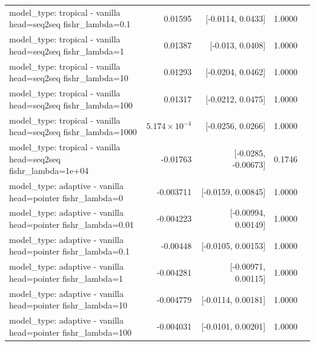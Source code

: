\documentclass[10pt]{article}
\makeatletter
\newcommand{\stackcell}[1]{\begin{tabular}[t]{@{}l@{}}#1\end{tabular}}
\makeatother
\begin{document}
{\begin{longtable}{lrrrl}
\stackcell{model\_type: tropical - vanilla\\\footnotesize head=seq2seq fishr\_lambda=0.1 } & 0.01595 & [-0.0114, 0.0433] & 1.0000 & \\
\stackcell{model\_type: tropical - vanilla\\\footnotesize head=seq2seq fishr\_lambda=1 } & 0.01387 & [-0.013, 0.0408] & 1.0000 & \\
\stackcell{model\_type: tropical - vanilla\\\footnotesize head=seq2seq fishr\_lambda=10 } & 0.01293 & [-0.0204, 0.0462] & 1.0000 & \\
\stackcell{model\_type: tropical - vanilla\\\footnotesize head=seq2seq fishr\_lambda=100 } & 0.01317 & [-0.0212, 0.0475] & 1.0000 & \\
\stackcell{model\_type: tropical - vanilla\\\footnotesize head=seq2seq fishr\_lambda=1000 } & $5.174\times10^{-4}$ & [-0.0256, 0.0266] & 1.0000 & \\
\stackcell{model\_type: tropical - vanilla\\\footnotesize head=seq2seq fishr\_lambda=1e+04 } & -0.01763 & [-0.0285, -0.00673] & 0.1746 & \\
\stackcell{model\_type: adaptive - vanilla\\\footnotesize head=pointer fishr\_lambda=0 } & -0.003711 & [-0.0159, 0.00845] & 1.0000 & \\
\stackcell{model\_type: adaptive - vanilla\\\footnotesize head=pointer fishr\_lambda=0.01 } & -0.004223 & [-0.00994, 0.00149] & 1.0000 & \\
\stackcell{model\_type: adaptive - vanilla\\\footnotesize head=pointer fishr\_lambda=0.1 } & -0.00448 & [-0.0105, 0.00153] & 1.0000 & \\
\stackcell{model\_type: adaptive - vanilla\\\footnotesize head=pointer fishr\_lambda=1 } & -0.004281 & [-0.00971, 0.00115] & 1.0000 & \\
\stackcell{model\_type: adaptive - vanilla\\\footnotesize head=pointer fishr\_lambda=10 } & -0.004779 & [-0.0114, 0.00181] & 1.0000 & \\
\stackcell{model\_type: adaptive - vanilla\\\footnotesize head=pointer fishr\_lambda=100 } & -0.004031 & [-0.0101, 0.00201] & 1.0000 & \\

\end{longtable}}
\end{document}
